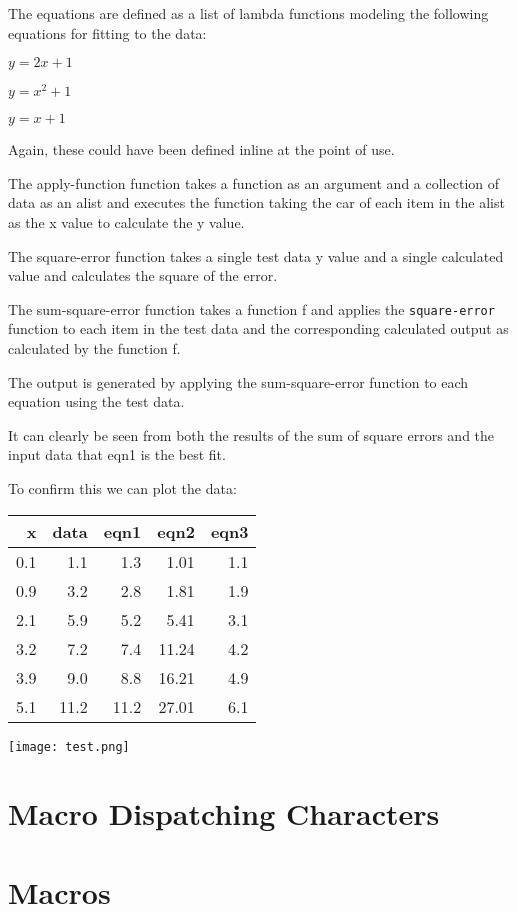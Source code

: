 \documentclass[11pt]{article}
\begin{document}
The equations are defined as a list of lambda functions modeling the
following equations for fitting to the data:

$y=2x+1$

$y=x^2+1$

$y=x+1$

Again, these could have been defined inline at the point of use. 

The apply-function function takes a function as an argument and a
collection of data as an alist and executes the function taking the
car of each item in the alist as the x value to calculate the y value.

The square-error function takes a single test data y value and a
single calculated value and calculates the square of the error.

The sum-square-error function takes a function f and applies the
\texttt{square-error} function to each item in the test data and the
corresponding calculated output as calculated by the function f.

The output is generated by applying the  sum-square-error function to
each equation using the test data.

It can clearly be seen from both the results of the sum of square
errors and the input data that eqn1 is the best fit.

To confirm this we can plot the data:

\begin{center}
\begin{tabular}{rrrrr}
x & data & eqn1 & eqn2 & eqn3\\
\hline
0.1 & 1.1 & 1.3 & 1.01 & 1.1\\
0.9 & 3.2 & 2.8 & 1.81 & 1.9\\
2.1 & 5.9 & 5.2 & 5.41 & 3.1\\
3.2 & 7.2 & 7.4 & 11.24 & 4.2\\
3.9 & 9.0 & 8.8 & 16.21 & 4.9\\
5.1 & 11.2 & 11.2 & 27.01 & 6.1\\
\end{tabular}
\end{center}

\texttt{[image: test.png]}

\section{Macro Dispatching Characters}
\label{sec-9}
\section{Macros}
\label{sec-10}
\end{document}

